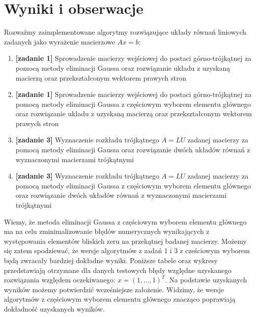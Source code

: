 \documentclass[11pt]{article}
\begin{document}
\section*{Wyniki i obserwacje}
    Rozważmy zaimplementowane algorytmy rozwiązujące układy równań liniowych zadanych jako wyrażenie macierzowe $Ax = b$:
    \begin{enumerate}
        \item \textbf{[zadanie 1]} Sprowadzenie macierzy wejściowej do postaci górno-trójkątnej za pomocą metody eliminacji Gaussa oraz rozwiązanie układu z uzyskaną macierzą oraz przekształconym wektorem prawych stron
        \item \textbf{[zadanie 1]} Sprowadzenie macierzy wejściowej do postaci górno-trójkątnej za pomocą metody eliminacji Gaussa z częściowym wyborem elementu głównego oraz rozwiązanie układu z uzyskaną macierzą oraz przekształconym wektorem prawych stron
        \item \textbf{[zadanie 3]} Wyznaczenie rozkładu trójkątnego $A = LU$ zadanej macierzy za pomocą metody eliminacji Gaussa oraz rozwiązanie dwóch układów równań z wyznaczonymi macierzami trójkątnymi
        \item \textbf{[zadanie 3]} Wyznaczenie rozkładu trójkątnego $A = LU$ zadanej macierzy za pomocą metody eliminacji Gaussa z częściowym wyborem elementu głównego oraz rozwiązanie dwóch układów równań z wyznaczonymi macierzami trójkątnymi
    \end{enumerate}

    \noindent
    Wiemy, że metoda eliminacji Gaussa z częściowym wyborem elementu głównego ma na celu zminimalizowanie błędów numerycznych wynikających z występowania elementów bliskich zeru na przekątnej badanej macierzy. Możemy się zatem spodziewać, że wersje algorytmów z zadań 1 i 3 z cześciowym wyborem będą zwracały bardziej dokładne wyniki.
    \newline\newline
    Poniższe tabele oraz wykresy przedstawiają otrzymane dla danych testowych błędy względne uzyskanego rozwiązania względem oczekiwanego: $x = (1, ..., 1)^T$. Na podstawie uzyskanych wyników możemy potwierdzić wcześniejsze założenie. Widzimy, że wersje algorytmów z częściowym wyborem elementu głównego znacząco poprawiają dokładność uzyskanych wyników.
\end{document}
